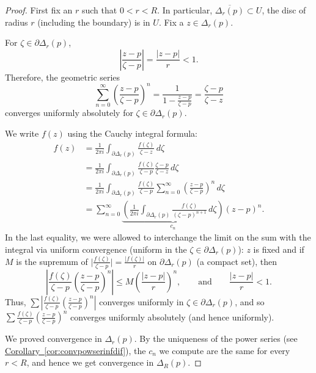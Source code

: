 \documentclass[12pt,openany]{book}
\newcommand{\sabs}[1]{\lvert {#1} \rvert}
\newcommand{\babs}[1]{\bigl\lvert {#1} \bigr\rvert}
\newcommand{\abs}[1]{\left\lvert {#1} \right\rvert}
\theoremstyle{plain}
\theoremstyle{remark}
\theoremstyle{definition}
\theoremstyle{exercise}
\theoremstyle{example}
\newcommand{\corref}[1]{\hyperref[#1]{Corollary~\ref*{#1}}}
\begin{document}
\begin{proof}
First fix an $r$ such that $0 < r < R$.
In particular, $\overline{\Delta_r(p)} \subset U$,
the disc of radius $r$ (including the boundary) is in $U$.
Fix a $z \in \Delta_r(p)$.

For $\zeta \in \partial \Delta_r(p)$, 
\begin{equation*}
\abs{\frac{z-p}{\zeta-p}} =
\frac{\sabs{z-p}}{r} < 1 .
\end{equation*}
Therefore,
the geometric series
\begin{equation*}
\sum_{n=0}^\infty
{\left(\frac{z-p}{\zeta-p}\right)}^n
=
\frac{1}{1-\frac{z-p}{\zeta-p}}
=
\frac{\zeta-p}{\zeta-z}
\end{equation*}
converges uniformly absolutely for $\zeta \in \partial \Delta_r(p)$.

We write $f(z)$ using the Cauchy integral formula:
\begin{equation*}
\begin{split}
f(z)
& =
\frac{1}{2\pi i}
\int_{\partial \Delta_r(p)}
\frac{f(\zeta)}{\zeta-z}
\,
d \zeta 
\\
& =
\frac{1}{2\pi i}
\int_{\partial \Delta_r(p)}
\frac{f(\zeta)}{\zeta-p}
\frac{\zeta-p}{\zeta-z}
\,
d \zeta 
\\
& =
\frac{1}{2\pi i}
\int_{\partial \Delta_r(p)}
\frac{f(\zeta)}{\zeta-p}
\sum_{n=0}^\infty
{\left(\frac{z-p}{\zeta-p}\right)}^n
\,
d \zeta 
\\
& =
\sum_{n=0}^\infty
\underbrace{
\left(
\frac{1}{2\pi i}
\int_{\partial \Delta_r(p)}
\frac{f(\zeta)}{{(\zeta-p)}^{n+1}}
\,
d \zeta 
\right)
}_{c_n}
{(z-p)}^n .
\end{split}
\end{equation*}
In the last equality, we were allowed to 
interchange the limit on the sum with the integral
via uniform convergence (uniform in the $\zeta \in \partial \Delta_r(p)$):
$z$ is fixed and if $M$ is the supremum of $\babs{\frac{f(\zeta)}{\zeta-p}} =
\frac{\sabs{f(\zeta)}}{r}$ on $\partial \Delta_r(p)$ (a compact set),
then
\begin{equation*}
\abs{
\frac{f(\zeta)}{\zeta-p}
{\left(\frac{z-p}{\zeta-p}\right)}^n
}
\leq
M 
{\left(\frac{\abs{z-p}}{r}\right)}^n,
\qquad \text{and} \qquad
\frac{\abs{z-p}}{r} < 1 .
\end{equation*}
Thus, $\sum 
\abs{
\frac{f(\zeta)}{\zeta-p}
{\left(\frac{z-p}{\zeta-p}\right)}^n
}$ converges uniformly in $\zeta \in \partial \Delta_r(p)$, and so
$\sum 
\frac{f(\zeta)}{\zeta-p}
{\left(\frac{z-p}{\zeta-p}\right)}^n$ converges uniformly absolutely
(and hence uniformly).

We proved convergence in $\Delta_r(p)$.
By the uniqueness of the power series (see \corref{cor:convpowserinfdif}),
the $c_n$ we compute are the same for every $r < R$, and hence
we get convergence in $\Delta_R(p)$.
\end{proof}
\end{document}
